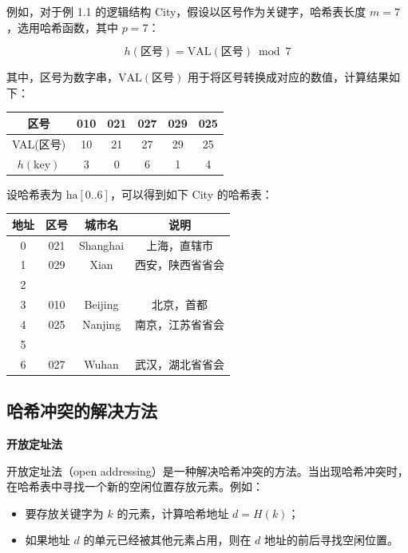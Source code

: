 \documentclass[lang=cn,newtx,10pt,scheme=chinese]{../elegantbook}
\begin{document}
例如，对于例 1.1 的逻辑结构 City，假设以区号作为关键字，哈希表长度 $m=7$，选用哈希函数，其中 $p=7$：

\[
h(\text{区号}) = \text{VAL}(\text{区号}) \bmod 7
\]

其中，区号为数字串，$\text{VAL}(\text{区号})$ 用于将区号转换成对应的数值，计算结果如下：

\begin{center}
\begin{tabular}{|c|c|c|c|c|c|}
\hline
区号 & 010 & 021 & 027 & 029 & 025 \\
\hline
VAL(区号) & 10 & 21 & 27 & 29 & 25 \\
\hline
$h(\text{key})$ & 3 & 0 & 6 & 1 & 4 \\
\hline
\end{tabular}
\end{center}

设哈希表为 $\text{ha}[0..6]$，可以得到如下 City 的哈希表：

\begin{center}
\begin{tabular}{|c|c|c|c|}
\hline
地址 & 区号 & 城市名 & 说明 \\
\hline
0 & 021 & Shanghai & 上海，直辖市 \\
1 & 029 & Xian     & 西安，陕西省省会 \\
2 &      &          & \\
3 & 010 & Beijing  & 北京，首都 \\
4 & 025 & Nanjing  & 南京，江苏省省会 \\
5 &      &          & \\
6 & 027 & Wuhan    & 武汉，湖北省省会 \\
\hline
\end{tabular}
\end{center}

\subsection{哈希冲突的解决方法}
\textbf{开放定址法}

开放定址法（open addressing）是一种解决哈希冲突的方法。当出现哈希冲突时，在哈希表中寻找一个新的空闲位置存放元素。例如：
\begin{itemize}
  \item 要存放关键字为 $k$ 的元素，计算哈希地址 $d = H(k)$；
  \item 如果地址 $d$ 的单元已经被其他元素占用，则在 $d$ 地址的前后寻找空闲位置。
\end{itemize}
\end{document}
